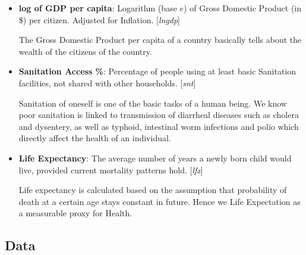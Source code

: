 \documentclass[
]{article}
\begin{document}
\begin{itemize}
\item
  \textbf{log of GDP per capita}: Logarithm (base \(e\)) of Gross
  Domestic Product (in \$) per citizen. Adjusted for Inflation.
  {[}\emph{lngdp}{]}

  The Gross Domestic Product per capita of a country basically tells
  about the wealth of the citizens of the country.
\item
  \textbf{Sanitation Access \%}: Percentage of people using at least
  basic Sanitation facilities, not shared with other households.
  {[}\emph{snt}{]}

  Sanitation of oneself is one of the basic tasks of a human being. We
  know poor sanitation is linked to transmission of diarrheal diseases
  such as cholera and dysentery, as well as typhoid, intestinal worm
  infections and polio which directly affect the health of an
  individual.
\item
  \textbf{Life Expectancy}: The average number of years a newly born
  child would live, provided current mortality patterns hold.
  {[}\emph{lfx}{]}

  Life expectancy is calculated based on the assumption that probability
  of death at a certain age stays constant in future. Hence we Life
  Expectation as a measurable proxy for Health.
\end{itemize}

\hypertarget{data}{%
\subsection{Data}\label{data}}
\end{document}
